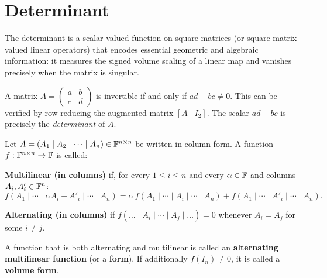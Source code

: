 \section{Determinant}
\label{sec:determinant}

The determinant is a scalar-valued function on square matrices (or
square-matrix-valued linear operators) that encodes essential geometric and
algebraic information: it measures the signed volume scaling of a linear map
and vanishes precisely when the matrix is singular.

\begin{tipbox}
A matrix $A=\begin{pmatrix}a&b\\c&d\end{pmatrix}$ is invertible if and
only if $ad-bc\neq 0$.  This can be verified by row-reducing the augmented
matrix $[A\mid I_2]$.  The scalar $ad-bc$ is precisely the
\emph{determinant} of $A$.
\end{tipbox}

\begin{defbox}
\label{def:multilinear-alternating}
Let $A=(A_1\mid A_2\mid\cdots\mid A_n)\in\mathbb{F}^{n\times n}$ be written in
column form.  A function $f:\mathbb{F}^{n\times n}\to\mathbb{F}$ is called:
\begin{enumerate}[label=\textbf{[\roman*]}]
    \item \textbf{Multilinear (in columns)} if, for every $1\le i\le n$
          and every $\alpha\in\mathbb{F}$ and columns $A_i,A'_i\in\mathbb{F}^n$:
          \[
            f(A_1\mid\cdots\mid\alpha A_i+A'_i\mid\cdots\mid A_n)
            = \alpha\,f(A_1\mid\cdots\mid A_i\mid\cdots\mid A_n)
            + f(A_1\mid\cdots\mid A'_i\mid\cdots\mid A_n).
          \]
    \item \textbf{Alternating (in columns)} if
          $f(\ldots\mid A_i\mid\cdots\mid A_j\mid\ldots)=0$
          whenever $A_i=A_j$ for some $i\neq j$.
\end{enumerate}
A function that is both alternating and multilinear is called an
\textbf{alternating multilinear function} (or a \textbf{form}).
If additionally $f(I_n)\neq 0$, it is called a \textbf{volume form}.
\end{defbox}

